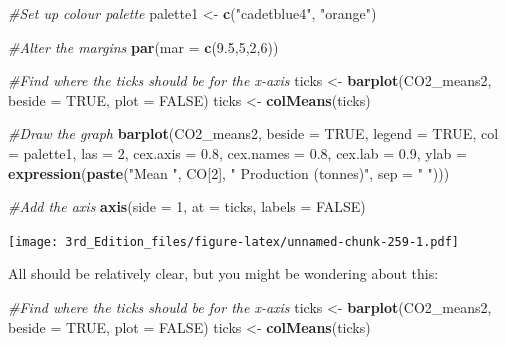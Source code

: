 \documentclass[
]{book}
\newenvironment{Shaded}{\begin{snugshade}}{\end{snugshade}}
\newcommand{\CommentTok}[1]{\textcolor[rgb]{0.56,0.35,0.01}{\textit{#1}}}
\newcommand{\DataTypeTok}[1]{\textcolor[rgb]{0.13,0.29,0.53}{#1}}
\newcommand{\DecValTok}[1]{\textcolor[rgb]{0.00,0.00,0.81}{#1}}
\newcommand{\FloatTok}[1]{\textcolor[rgb]{0.00,0.00,0.81}{#1}}
\newcommand{\KeywordTok}[1]{\textcolor[rgb]{0.13,0.29,0.53}{\textbf{#1}}}
\newcommand{\NormalTok}[1]{#1}
\newcommand{\OtherTok}[1]{\textcolor[rgb]{0.56,0.35,0.01}{#1}}
\newcommand{\StringTok}[1]{\textcolor[rgb]{0.31,0.60,0.02}{#1}}
\begin{document}
\begin{Shaded}
\begin{Highlighting}[]
\CommentTok{#Set up colour palette}
\NormalTok{palette1 <-}\StringTok{ }\KeywordTok{c}\NormalTok{(}\StringTok{"cadetblue4"}\NormalTok{, }\StringTok{"orange"}\NormalTok{) }

\CommentTok{#Alter the margins}
\KeywordTok{par}\NormalTok{(}\DataTypeTok{mar =} \KeywordTok{c}\NormalTok{(}\FloatTok{9.5}\NormalTok{,}\DecValTok{5}\NormalTok{,}\DecValTok{2}\NormalTok{,}\DecValTok{6}\NormalTok{))}

\CommentTok{#Find where the ticks should be for the x-axis}
\NormalTok{ticks <-}\StringTok{ }\KeywordTok{barplot}\NormalTok{(CO2_means2, }\DataTypeTok{beside =} \OtherTok{TRUE}\NormalTok{, }\DataTypeTok{plot =} \OtherTok{FALSE}\NormalTok{)}
\NormalTok{ticks <-}\StringTok{ }\KeywordTok{colMeans}\NormalTok{(ticks)}

\CommentTok{#Draw the graph}
\KeywordTok{barplot}\NormalTok{(CO2_means2, }
        \DataTypeTok{beside =} \OtherTok{TRUE}\NormalTok{,}
        \DataTypeTok{legend =} \OtherTok{TRUE}\NormalTok{,}
        \DataTypeTok{col =}\NormalTok{ palette1,}
        \DataTypeTok{las =} \DecValTok{2}\NormalTok{,}
        \DataTypeTok{cex.axis =} \FloatTok{0.8}\NormalTok{,}
        \DataTypeTok{cex.names =} \FloatTok{0.8}\NormalTok{,}
        \DataTypeTok{cex.lab =} \FloatTok{0.9}\NormalTok{,}
        \DataTypeTok{ylab =} \KeywordTok{expression}\NormalTok{(}\KeywordTok{paste}\NormalTok{(}\StringTok{"Mean "}\NormalTok{, CO[}\DecValTok{2}\NormalTok{], }\StringTok{" Production (tonnes)"}\NormalTok{, }\DataTypeTok{sep =} \StringTok{" "}\NormalTok{)))}

\CommentTok{#Add the axis}
\KeywordTok{axis}\NormalTok{(}\DataTypeTok{side =} \DecValTok{1}\NormalTok{, }\DataTypeTok{at =}\NormalTok{ ticks, }\DataTypeTok{labels =} \OtherTok{FALSE}\NormalTok{)}
\end{Highlighting}
\end{Shaded}

\texttt{[image: 3rd\_Edition\_files/figure-latex/unnamed-chunk-259-1.pdf]}

All should be relatively clear, but you might be wondering about this:

\begin{Shaded}
\begin{Highlighting}[]
\CommentTok{#Find where the ticks should be for the x-axis  }
\NormalTok{ticks <-}\StringTok{ }\KeywordTok{barplot}\NormalTok{(CO2_means2, }\DataTypeTok{beside =} \OtherTok{TRUE}\NormalTok{, }\DataTypeTok{plot =} \OtherTok{FALSE}\NormalTok{)  }
\NormalTok{ticks <-}\StringTok{ }\KeywordTok{colMeans}\NormalTok{(ticks)}
\end{Highlighting}
\end{Shaded}
\end{document}
